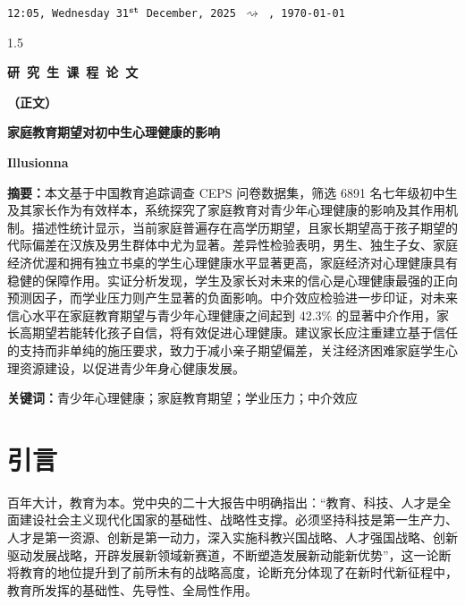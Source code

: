 \documentclass[zihao = -4, linespread = 1.5]{article}
\begin{document}

\clearpage
\thispagestyle{empty}
\centerline{\tt12:05, Wednesday 31$^{\tt st}$ December, 2025 $\rightsquigarrow$ \currenttime,\ \today}
\mbox{}
\begin{spacing}{1.5}
    \tableofcontents
\end{spacing}
\clearpage
\vspace*{12em}

\centerline{\heiti\bfseries{}研~究~生~课~程~论~文}
\centerline{\heiti\bfseries{}（正文）}
\vspace*{4.2em}
\centerline{\bfseries{}家庭教育期望对初中生心理健康的影响}
\vspace*{1.8em}
\centerline{\bfseries{}Illusionna}
\vspace*{3.2em}

\noindent\textbf{摘要：}本文基于中国教育追踪调查 CEPS 问卷数据集，筛选 6891 名七年级初中生及其家长作为有效样本，系统探究了家庭教育对青少年心理健康的影响及其作用机制。描述性统计显示，当前家庭普遍存在高学历期望，且家长期望高于孩子期望的代际偏差在汉族及男生群体中尤为显著。差异性检验表明，男生、独生子女、家庭经济优渥和拥有独立书桌的学生心理健康水平显著更高，家庭经济对心理健康具有稳健的保障作用。实证分析发现，学生及家长对未来的信心是心理健康最强的正向预测因子，而学业压力则产生显著的负面影响。中介效应检验进一步印证，对未来信心水平在家庭教育期望与青少年心理健康之间起到 42.3\% 的显著中介作用，家长高期望若能转化孩子自信，将有效促进心理健康。建议家长应注重建立基于信任的支持而非单纯的施压要求，致力于减小亲子期望偏差，关注经济困难家庭学生心理资源建设，以促进青少年身心健康发展。

\vspace*{1em}

\noindent\textbf{关键词：}青少年心理健康；家庭教育期望；学业压力；中介效应


\clearpage
\chead{}
\cfoot{\thepage}
\setcounter{page}{1}



\section{引言}
百年大计，教育为本。党中央的二十大报告中明确指出：“教育、科技、人才是全面建设社会主义现代化国家的基础性、战略性支撑。必须坚持科技是第一生产力、人才是第一资源、创新是第一动力，深入实施科教兴国战略、人才强国战略、创新驱动发展战略，开辟发展新领域新赛道，不断塑造发展新动能新优势”，这一论断将教育的地位提升到了前所未有的战略高度，论断充分体现了在新时代新征程中，教育所发挥的基础性、先导性、全局性作用。
\end{document}
